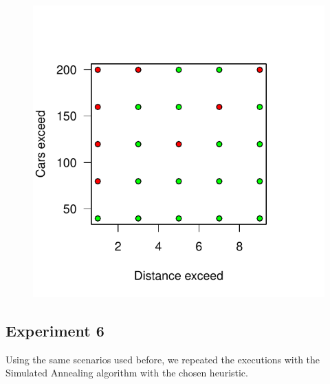 \documentclass[12]{article}
\begin{document}
\begin{figure}[H]
  \captionsetup{justification=centering}
   \centering
    \includegraphics[scale=0.8]{Results/data_5_4.pdf}
      \caption{}
      \label{fig:data_5_4}
  \end{figure}
    \vspace{1cm}

\subsection{Experiment 6}
Using the same scenarios used before, we repeated the executions with the Simulated Annealing algorithm with the chosen heuristic.
\end{document}
